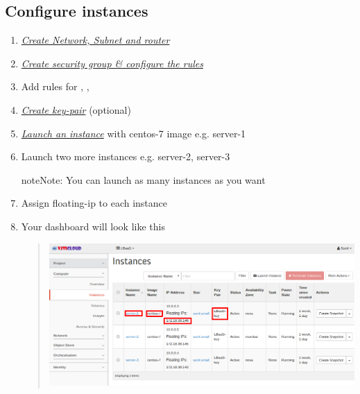 \documentclass[letterpaper,10pt,english]{sphinxmanual}
\begin{document}
\subsection{Configure instances}
\label{_source/projects/project2:configure-instances}\begin{enumerate}
\item {} 
{\hyperref[_source/user_guide/launch_instance:create-network]{\emph{Create Network, Subnet and router}}}

\item {} 
{\hyperref[_source/user_guide/launch_instance:create-security-group]{\emph{Create security group \& configure the rules}}}

\item {} 
Add rules for , , 

\item {} 
{\hyperref[_source/user_guide/launch_instance:create-key-pair]{\emph{Create key-pair}}} (optional)

\item {} 
{\hyperref[_source/user_guide/launch_instance:launch-an-instance]{\emph{Launch an instance}}} with centos-7 image e.g. server-1

\item {} 
Launch two more instances e.g. server-2, server-3

\begin{notice}{note}{Note:}
You can launch as many instances as you want
\end{notice}

\item {} 
Assign floating-ip to each instance

\item {} 
Your dashboard will look like this
\begin{quote}

\includegraphics{lbaas_instances.png}
\end{quote}


\end{enumerate}
\end{document}
